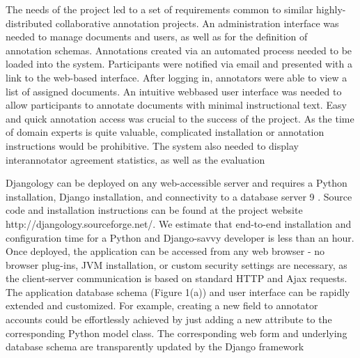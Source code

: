 \begin{description}
    The needs of the project led to a set of requirements common to similar highly-distributed collaborative annotation
    projects. An administration interface was needed to manage documents and users, as well as for the definition of
    annotation schemas. Annotations created via an automated
    process needed to be loaded into the system. Participants
    were notified via email and presented with a link to the
    web-based interface. After logging in, annotators were able
    to view a list of assigned documents. An intuitive webbased user interface was needed to allow participants to annotate documents with minimal instructional text. Easy and
    quick annotation access was crucial to the success of the
    project. As the time of domain experts is quite valuable,
    complicated installation or annotation instructions would
    be prohibitive. The system also needed to display interannotator agreement statistics, as well as the evaluation

    Djangology can be deployed on any web-accessible server
    and requires a Python installation, Django installation, and
    connectivity to a database server 9
    . Source code and installation instructions can be found at the project website http://djangology.sourceforge.net/. We estimate that
    end-to-end installation and configuration time for a Python
    and Django-savvy developer is less than an hour. Once
    deployed, the application can be accessed from any web
    browser - no browser plug-ins, JVM installation, or custom
    security settings are necessary, as the client-server communication is based on standard HTTP and Ajax requests.
    The application database schema (Figure 1(a)) and user interface can be rapidly extended and customized. For example, creating a new field to annotator accounts could be
    effortlessly achieved by just adding a new attribute to the
    corresponding Python model class. The corresponding web
    form and underlying database schema are transparently updated by the Django framework 


\end{description}
